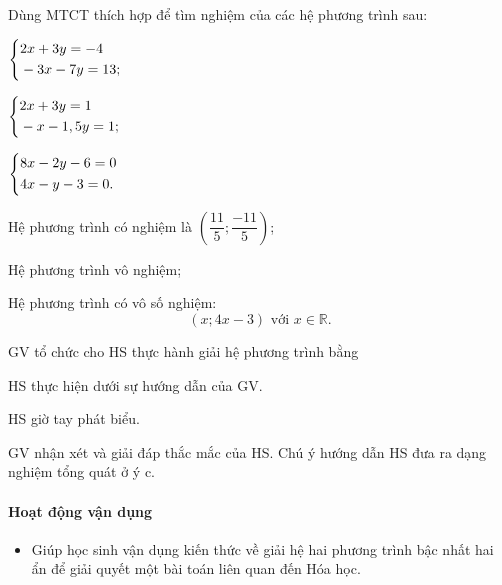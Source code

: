 \begin{thuchanh}
    Dùng MTCT thích hợp để tìm nghiệm của các hệ phương trình sau:
    \begin{listEX}[2]
        \item $\left\{\begin{aligned}&2x + 3y = -4 \\ &-3x - 7y = 13;\end{aligned}\right.$
        \item $\left\{\begin{aligned}&2x + 3y = 1 \\ &-x - 1,5y = 1;\end{aligned}\right.$
        \item $\left\{\begin{aligned}&8x - 2y - 6 = 0 \\ &4x - y - 3 = 0.\end{aligned}\right.$
    \end{listEX}
    \doicot
    \huongdan
    \begin{listEX}
        \item Hệ phương trình có nghiệm là $\left(\dfrac{11}{5};\dfrac{-11}{5}\right)$;
        \item Hệ phương trình vô nghiệm;
        \item Hệ phương trình có vô số nghiệm:
        $$(x;4x-3)\text{ với }x\in\mathbb{R}.$$
    \end{listEX}
\end{thuchanh}

\tochucthuchien

\begin{tcth}
    \buocmot
    \item GV tổ chức cho HS thực hành giải hệ phương trình bằng 
    \buochai
    \item HS thực hiện dưới sự hướng dẫn của GV. 
    \buocba
    \item HS giờ tay phát biểu.
    \buocbon
    \item GV nhận xét và giải đáp thắc mắc của HS. Chú ý hướng dẫn HS đưa ra dạng nghiệm tổng quát ở ý c.
\end{tcth}

\paragraph{Hoạt động vận dụng}

\muctieu

\begin{itemize}
    \item  Giúp học sinh vận dụng kiến thức về giải hệ hai phương trình bậc nhất hai ẩn để giải quyết một bài toán liên quan đến Hóa học.
\end{itemize}

\noidungsanpham

